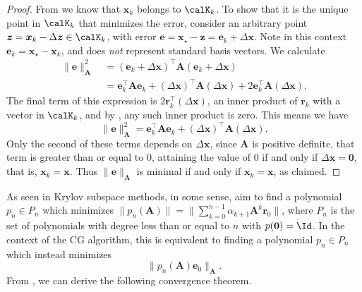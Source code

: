 \begin{proof}
    From  we know that $\bm{x}_{k}$ belongs to $\calK_{k}$. To show that it is the unique point in $\calK_{k}$ that minimizes the error, consider an arbitrary point $\bm{z} = \bm{x}_k - \Delta \bm{z} \in \calK_{k}$, with error $\bm{e} = \bm{x}_{\star} - \bm{z} = \bm{e}_{k} + \Delta \bm{x}$. Note in this context $\bm{e}_{k} = \bm{x}_{\star} - \bm{x}_{k}$, and does {\it not} represent standard basis vectors. We calculate
    \begin{align*}
        \| \bm{e} \|_{\bm{A}}^2 \
         & = \left( \bm{e}_{k} + \Delta \bm{x} \right)^{\intercal} \bm{A} \left( \bm{e}_{k} + \Delta \bm{x} \right)                                                                                  \\
         & = \bm{e}_{k}^{\intercal} \bm{A} \bm{e}_{k} + \left( \Delta \bm{x} \right)^{\intercal} \bm{A} \left( \Delta \bm{x} \right) + 2 \bm{e}_{k}^{\intercal} \bm{A} \left( \Delta \bm{x} \right).
    \end{align*}
    The final term of this expression is $2 \bm{r}_{k}^{\intercal} \left( \Delta \bm{x} \right)$, an inner product of $\bm{r}_{k}$ with a vector in $\calK_k$, and by , any such inner product is zero. This means we have
    \[
        \| \bm{e} \|_{\bm{A}}^{2} = \bm{e}_{k}^{\intercal} \bm{A} \bm{e}_{k} + \left( \Delta \bm{x} \right)^{\intercal} \bm{A} \left( \Delta \bm{x} \right).
    \]
    Only the second of these terms depends on $\Delta \bm{x}$, since $\bm{A}$ is positive definite, that term is greater than or equal to $0$, attaining the value of $0$ if and only if $\Delta \bm{x} = \bm{0}$, that is, $\bm{x}_k = \bm{x}$. Thus $\| \bm{e} \|_{\bm{A}}$ is minimal if and only if $\bm{x}_{k} = \bm{x}$, as claimed.
\end{proof}

As seen in  Krylov subspace methods, in some sense, aim to find a polynomial $p_n \in P_n$ which minimizes $\| p_n \left( \bm{A} \right) \| = \| \sum_{k=0}^{n-1} \alpha_{k + 1} \bm{A}^{k} \bm{r}_{0} \|$, where $P_n$ is the set of polynomials with degree less than or equal to $n$ with $p(\bm{0}) = \Id$. In the context of the CG algorithm, this is equivalent to finding a polynomial $p_n \in P_n$ which instead minimizes
\begin{equation} \label{eq: CG-poly-min}
    \| p_n \left( \bm{A} \right) \bm{e}_{0} \|_{\bm{A}}.
\end{equation}
From , we can derive the following convergence theorem.

